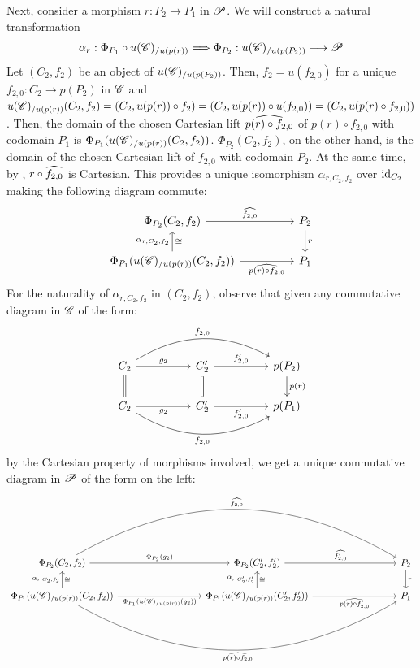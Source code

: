 \documentclass[11pt]{amsart}
\begin{document}
\begin{cns}
Next, consider a morphism $r : P_2 \to P_1$ in $\mathscr{P}$. We will construct a natural transformation
\[
\alpha_r : \Phi_{P_1} \circ u(\sC)_{/u(p(r))} \To \Phi_{P_2} : u(\sC)_{/u(p(P_2))} \to \sP
\]
Let $(C_2, f_2)$ be an object of $u(\mathscr{C})_{/u(p(P_2))}$. Then, $f_2 = u(f_{2, 0})$ for a unique
$f_{2, 0} : C_2 \to p(P_2)$ in $\mathscr{C}$ and
$u(\mathscr{C})_{/u(p(r))}(C_2, f_2) = (C_2, u(p(r)) \circ f_2)= (C_2, u(p(r)) \circ u(f_{2, 0}))
= (C_2, u(p(r) \circ f_{2, 0}))$.
Then, the domain of the chosen Cartesian lift $\widehat{p(r) \circ f_{2, 0}}$ of
$p(r) \circ f_{2, 0}$ with codomain $P_1$ is $\Phi_{P_1}(u(\mathscr{C})_{/u(p(r))}(C_2, f_2))$.
$\Phi_{P_2}(C_2, f_2)$, on the other hand, is
the domain of the chosen Cartesian lift of $f_{2, 0}$ with codomain $P_2$.
At the same time, by
\cite[\href{https://stacks.math.columbia.edu/tag/003V}{Lemma 003V}]{stacks-project},
$r \circ \widehat{f_{2, 0}}$ is Cartesian.
This provides a unique isomorphism $\alpha_{r, C_2, f_2}$ over $\mathrm{id}_{C_2}$
making the following diagram commute:
\[\begin{tikzcd}[column sep=huge]
\Phi_{P_2}(C_2, f_2) \ar[r, "\wh{f_{2, 0}}"] \ar[from=d, "\alpha_{r, C_2, f_2}" left, "\cong" right] &
P_2 \ar[d, "r"] \\
\Phi_{P_1}(u(\sC)_{/u(p(r))}(C_2, f_2)) \ar[r, "\wh{p(r) \circ f_{2, 0}}" below] & P_1
\end{tikzcd}\]
For the naturality of $\alpha_{r, C_2, f_2}$ in $(C_2, f_2)$, observe that
given any commutative diagram in $\mathscr{C}$ of the form:
\[\begin{tikzcd}[column sep=huge]
C_2 \ar[r, "g_2"] \ar[rr, bend left, "f_{2, 0}"] \ar[d, equal] &
C_2' \ar[r, "f'_{2, 0}"] \ar[d, equal] &
p(P_2) \ar[d, "p(r)"] \\
C_2 \ar[r, "g_2" below] \ar[rr, bend right, "f_{2, 0}" below] &
C_2' \ar[r, "f'_{2, 0}" below] &
p(P_1)
\end{tikzcd}\]
by the Cartesian property of morphisms involved,
we get a unique commutative diagram in $\mathscr{P}$ of the form on the left:
\[\begin{tikzcd}[column sep=9em]
\Phi_{P_2}(C_2, f_2) \ar[r, "\Phi_{P_2}(g_2)"] \ar[rr, bend left, "\wh{f_{2, 0}}"]
    \ar[from=d, "\alpha_{r, C_2, f_2}" left, "\cong" right] &
\Phi_{P_2}(C_2', f_2') \ar[r, "\wh{f'_{2, 0}}"] \ar[from=d, "\alpha_{r, C'_2, f'_2}", "\cong" right] &
P_2 \ar[d, "r"] \\
\Phi_{P_1}(u(\sC)_{/u(p(r))}(C_2, f_2)) \ar[r, "\Phi_{P_1}(u(\sC)_{/u(p(r))}(g_2))" below]
    \ar[rr, bend right, "\wh{p(r) \circ f_{2, 0}}" below] &
\Phi_{P_1}(u(\sC)_{/u(p(r))}(C'_2, f'_2)) \ar[r, "\wh{p(r) \circ f'_{2, 0}}" below] &
P_1
\end{tikzcd}\]


\end{cns}
\end{document}
